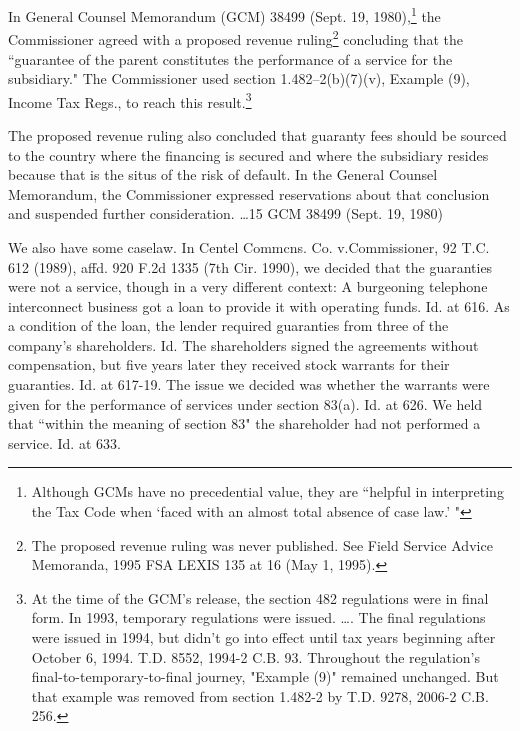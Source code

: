 \begin{select}
In General Counsel Memorandum (GCM) 38499 (Sept. 19, 1980),\footnote[12]{Although GCMs have no precedential value, they are ``helpful in interpreting the Tax Code when `faced with an almost total absence of case law.' "} the Commissioner agreed with a proposed revenue ruling\footnote[13]{The proposed revenue ruling was never published. See Field Service Advice Memoranda, 1995 FSA LEXIS 135 at 16 (May 1, 1995).} concluding that the ``guarantee of the parent constitutes the performance of a service for the subsidiary." The Commissioner used section 1.482--2(b)(7)(v), Example (9), Income Tax Regs., to reach this result.\footnote[14]{At the time of the GCM's release, the section 482 regulations were in final form. In 1993, temporary regulations were issued. \ldots. The final regulations were issued in 1994, but didn't go into effect until tax years beginning after October 6, 1994. T.D. 8552, 1994-2 C.B. 93. Throughout the regulation's final-to-temporary-to-final journey, "Example (9)" remained unchanged. But that example was removed from section 1.482-2 by T.D. 9278, 2006-2 C.B. 256.}

The proposed revenue ruling also concluded that guaranty fees should be sourced to the country where the financing is secured and where the subsidiary resides because that is the situs of the risk of default. In the General Counsel Memorandum, the Commissioner expressed reservations about that conclusion and suspended further consideration. \ldots 15 GCM 38499 (Sept. 19, 1980)

We also have some caselaw. In Centel Commcns. Co. v.\@ Commissioner, 92 T.C. 612 (1989), affd. 920 F.2d 1335 (7th Cir. 1990), we decided that the guaranties were not a service, though in a very different context: A burgeoning telephone interconnect business got a loan to provide it with operating funds. Id. at 616. As a condition of the loan, the lender required guaranties from three of the company's shareholders. Id. The shareholders signed the agreements without compensation, but five years later they received stock warrants for their guaranties. Id. at 617-19. The issue we decided was whether the warrants were given for the performance of services under section 83(a). Id. at 626. We held that ``within the meaning of section 83" the shareholder had not performed a service. Id. at 633.


\end{select}
